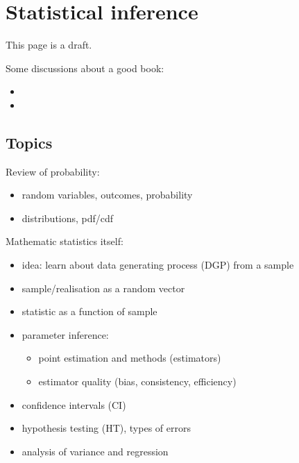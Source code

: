 \documentclass[letterpaper,10pt,english]{sphinxmanual}
\begin{document}
\section{Statistical inference}
\label{\detokenize{textbook/statistics:statistical-inference}}\label{\detokenize{textbook/statistics::doc}}
This page is a draft.

Some discussions about a good book:
\begin{itemize}
\item {} 

\item {} 

\end{itemize}


\subsection{Topics}
\label{\detokenize{textbook/statistics:topics}}
Review of probability:
\begin{itemize}
\item {} 
random variables, outcomes, probability

\item {} 
distributions, pdf/cdf

\end{itemize}

Mathematic statistics itself:
\begin{itemize}
\item {} 
idea: learn about data generating process (DGP) from a sample

\item {} 
sample/realisation as a random vector

\item {} 
statistic as a function of sample

\item {} 
parameter inference:
\begin{itemize}
\item {} 
point estimation and methods (estimators)

\item {} 
estimator quality (bias, consistency, efficiency)

\end{itemize}

\item {} 
confidence intervals (CI)

\item {} 
hypothesis testing (HT), types of errors

\item {} 
analysis of variance and regression

\end{itemize}
\end{document}

